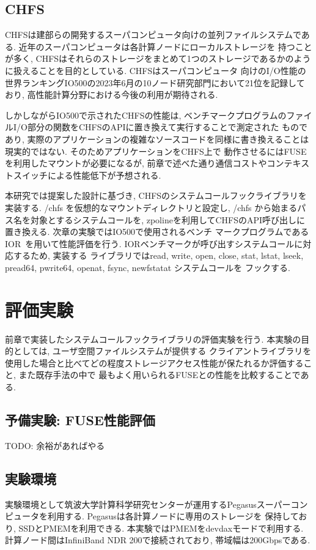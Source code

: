 \documentclass[a4paper,11pt]{jreport}
\begin{document}
\section{CHFS}
CHFSは建部らの開発するスーパコンピュータ向けの並列ファイルシステムである. 近年のスーパコンピュータは各計算ノードにローカルストレージを
持つことが多く, CHFSはそれらのストレージをまとめて1つのストレージであるかのように扱えることを目的としている. CHFSはスーパコンピュータ
向けのI/O性能の世界ランキングIO500の2023年6月の10ノード研究部門において21位を記録しており, 高性能計算分野における今後の利用が期待される.

しかしながらIO500で示されたCHFSの性能は, ベンチマークプログラムのファイルI/O部分の関数をCHFSのAPIに置き換えて実行することで測定された
ものであり, 実際のアプリケーションの複雑なソースコードを同様に書き換えることは現実的ではない. そのためアプリケーションをCHFS上で
動作させるにはFUSEを利用したマウントが必要になるが, 前章で述べた通り通信コストやコンテキストスイッチによる性能低下が予想される.

本研究では提案した設計に基づき, CHFSのシステムコールフックライブラリを実装する. /chfs を仮想的なマウントディレクトリと設定し, /chfs
から始まるパス名を対象とするシステムコールを, zpolineを利用してCHFSのAPI呼び出しに置き換える. 次章の実験ではIO500で使用されるベンチ
マークプログラムであるIOR~\cite{ior}を用いて性能評価を行う. IORベンチマークが呼び出すシステムコールに対応するため, 実装する
ライブラリではread, write, open, close, stat, lstat, lseek, pread64, pwrite64, openat, fsync, newfstatat システムコールを
フックする.

\chapter{評価実験}
前章で実装したシステムコールフックライブラリの評価実験を行う. 本実験の目的としては, ユーザ空間ファイルシステムが提供する
クライアントライブラリを使用した場合と比べてどの程度ストレージアクセス性能が保たれるか評価すること, また既存手法の中で
最もよく用いられるFUSEとの性能を比較することである. 

\section{予備実験: FUSE性能評価}
TODO: 余裕があればやる
\section{実験環境}
実験環境として筑波大学計算科学研究センターが運用するPegasusスーパーコンピュータを利用する. Pegasusは各計算ノードに専用のストレージを
保持しており, SSDとPMEMを利用できる. 本実験ではPMEMをdevdaxモードで利用する. 計算ノード間はInfiniBand NDR 200で接続されており, 
帯域幅は200Gbpsである. 
\end{document}
